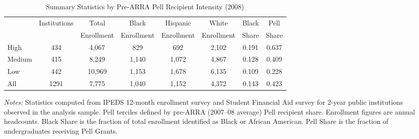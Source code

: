 \begin{table}[htbp]
\centering
\caption{Summary Statistics by Pre-ARRA Pell Recipient Intensity (2008)}
\label{tab:summary}
\begin{adjustbox}{max width=\textwidth}
\begin{tabular}{lccccccc}
\toprule
 & Institutions & Total & Black & Hispanic & White & Black & Pell \\
 &  & Enrollment & Enrollment & Enrollment & Enrollment & Share & Share \\
\midrule
High & 434 & 4,067 & 829 & 692 & 2,102 & 0.191 & 0.637 \\
Medium & 415 & 8,249 & 1,140 & 1,072 & 4,867 & 0.128 & 0.409 \\
Low & 442 & 10,969 & 1,153 & 1,678 & 6,135 & 0.109 & 0.228 \\
\midrule
All & 1291 & 7,775 & 1,040 & 1,152 & 4,372 & 0.143 & 0.423 \\
\bottomrule
\end{tabular}
\end{adjustbox}
\par\vspace{0.5em}
\begin{minipage}{\textwidth}
\small
\textit{Notes:} Statistics computed from IPEDS 12-month enrollment survey and Student Financial Aid survey for 2-year public institutions observed in the analysis sample. Pell terciles defined by pre-ARRA (2007--08 average) Pell recipient share. Enrollment figures are annual headcounts. Black Share is the fraction of total enrollment identified as Black or African American. Pell Share is the fraction of undergraduates receiving Pell Grants.
\end{minipage}
\end{table}
